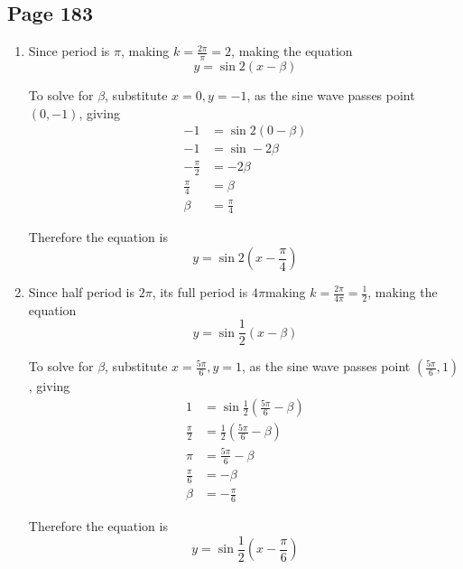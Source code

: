 \documentclass{article}
\newenvironment{solutions}[1]
{\subsection*{#1}
 \begin{enumerate}[leftmargin=1.5em]}
{\end{enumerate}}
\newcommand{\solution}{\item}
\begin{document}
\begin{solutions}{Page 183}
\solution
Since period is $\pi$, making $k=\frac{2\pi}{\pi}=2$, making the equation \[y=\sin 2(x-\beta) \]

To solve for $\beta$, substitute $x=0,y=-1$, as the sine wave passes point $(0,-1)$, giving
\begin{align*}
    -1 &= \sin 2(0-\beta)\\
    -1 &= \sin -2\beta\\
    -\frac{\pi}{2} &= -2\beta\\
    \frac{\pi}{4} &= \beta\\
    \beta &= \frac{\pi}{4}
\end{align*}

Therefore the equation is \[y=\sin 2\left(x-\frac{\pi}{4}\right)\]

\solution
Since half period is $2\pi$, its full period is $4\pi $making $k=\frac{2\pi}{4\pi}=\frac{1}{2}$, making the equation \[y=\sin \frac{1}{2}(x-\beta) \]

To solve for $\beta$, substitute $x=\frac{5\pi}{6},y=1$, as the sine wave passes point $(\frac{5\pi}{6},1)$, giving
\begin{align*}
    1 &= \sin \frac{1}{2} \left( \frac{5\pi}{6}-\beta \right)\\
    \frac{\pi}{2} &= \frac{1}{2}\left(\frac{5\pi}{6}-\beta\right)\\
    \pi &= \frac{5\pi}{6}-\beta\\
    \frac{\pi}{6} &= -\beta\\
    \beta &= -\frac{\pi}{6}
\end{align*}

Therefore the equation is \[y=\sin \frac{1}{2}\left(x-\frac{\pi}{6}\right)\]
\end{solutions}
\end{document}
